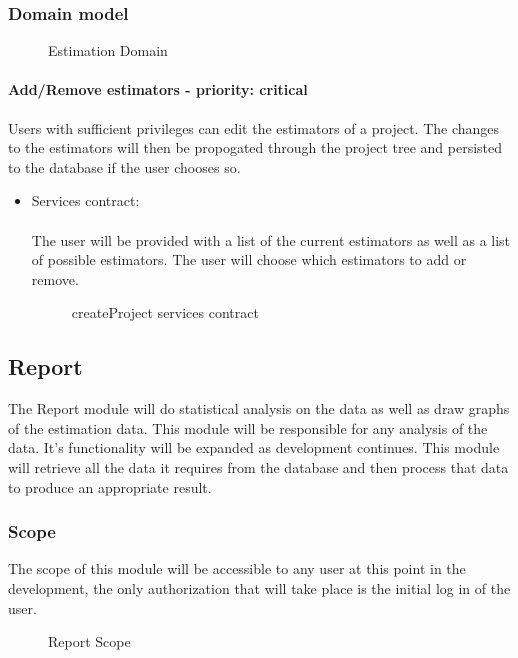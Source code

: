 \subsubsection{Domain model}
	\begin{figure}[H]
	    	\centering
	    	\caption{Estimation Domain}
	    	\label{fig:Estimation_Domain.png}
   	\end{figure}

\paragraph{Add/Remove estimators - priority: critical}
Users with sufficient privileges can edit the estimators of a project. The changes to the estimators will then be propogated through the project tree and persisted to the database if the user chooses so.

\begin{itemize}
	\item Services contract:\\ \\
	The user will be provided with a list of the current estimators as well as a list of possible estimators. The user will choose which estimators to add or remove.
	\begin{figure}[H]
    	\centering
    	\caption{createProject services contract}
    	\label{fig:addremove_estimators_services_contract}
   	\end{figure}
\end{itemize}

\subsection{Report}
The Report module will do statistical analysis on the data as well as draw graphs of the estimation data. This module will be responsible for any analysis of the data. It's functionality will be expanded as development continues. This module will retrieve all the data it requires from the database and then process that data to produce an appropriate result.
\subsubsection{Scope}
The scope of this module will be accessible to any user at this point in the development, the only authorization that will take place is the initial log in of the user.
	\begin{figure}[H]
	    	\centering
	    	\caption{Report Scope}
	    	\label{fig:Report_Scope.png}
   	\end{figure}
